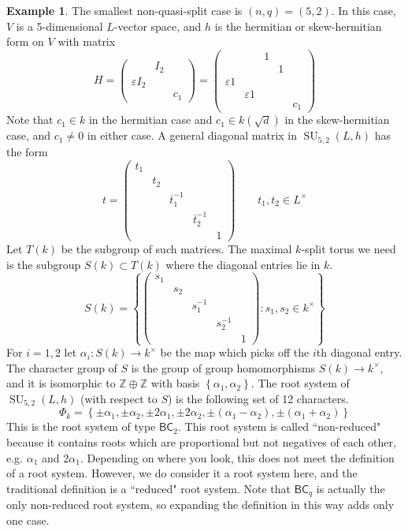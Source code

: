 \documentclass[12pt]{article}
\theoremstyle{definition}
\newtheorem{example}[theorem]{Example}
\newcommand{\Z}{\mathbb{Z}}
\newcommand{\eps}{\varepsilon}
\newcommand{\lb}{\left\{}
\newcommand{\rb}{\right\}}
\newcommand{\inv}{^{-1}}
\newcommand{\ov}{\overline}
\DeclareMathOperator{\SU}{SU}
\begin{document}
\begin{example}
The smallest non-quasi-split case is $(n,q) = (5,2)$. In this case, $V$ is a 5-dimensional $L$-vector space, and $h$ is the hermitian or skew-hermitian form on $V$ with matrix
\[
	H =
	\begin{pmatrix}
		& I_2 \\
		\eps I_2 \\
		&& c_1
	\end{pmatrix}
	=
	\begin{pmatrix}
		&& 1 \\
		&&& 1 \\
		\eps 1 \\	
		& \eps 1 \\
		&&&& c_1
	\end{pmatrix}
\]
Note that $c_1 \in k$ in the hermitian case and $c_1 \in k(\sqrt{d})$ in the skew-hermitian case, and $c_1 \neq 0$ in either case. A general diagonal matrix in $\SU_{5,2}(L,h)$ has the form
\[
	t = 
	\begin{pmatrix}
		t_1 \\
		& t_2 \\
		&& \ov t_1 \inv \\
		&&& \ov t_2 \inv \\
		&&&& 1
	\end{pmatrix}
	\qquad t_1, t_2 \in L^\times
\]
Let $T(k)$ be the subgroup of such matrices. The maximal $k$-split torus we need is the subgroup $S(k) \subset T(k)$ where the diagonal entries lie in $k$.
\[
	S(k) = 
	\lb
	\begin{pmatrix}
		s_1 \\
		& s_2 \\
		&& s_1 \inv \\
		&&& s_2 \inv \\
		&&&& 1
	\end{pmatrix}
	: s_1, s_2 \in k^\times
	\rb
\]
For $i = 1, 2$ let $\alpha_i:S(k) \to k^\times$ be the map which picks off the $i$th diagonal entry. The character group of $S$ is the group of group homomorphisms $S(k) \to k^\times$, and it is isomorphic to $\Z \oplus \Z$ with basis $\lb \alpha_1, \alpha_2 \rb$. The root system of $\SU_{5,2}(L,h)$ (with respect to $S$) is the following set of 12 characters.
\[
	\Phi_k = \lb \pm \alpha_1, \pm \alpha_2, \pm 2 \alpha_1, \pm 2\alpha_2, \pm (\alpha_1 - \alpha_2), \pm (\alpha_1 + \alpha_2) \rb
\]
This is the root system of type $\mathsf{BC}_2$. This root system is called ``non-reduced" because it contains roots which are proportional but not negatives of each other, e.g. $\alpha_1$ and $2\alpha_1$. Depending on where you look, this does not meet the definition of a root system. However, we do consider it a root system here, and the traditional definition is a ``reduced" root system. Note that $\mathsf{BC}_q$ is actually the only non-reduced root system, so expanding the definition in this way adds only one case.
\end{example}
\end{document}
